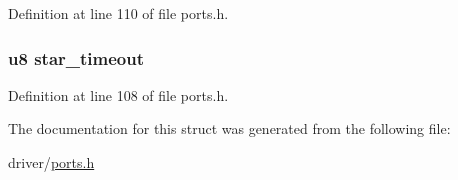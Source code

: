 \-Definition at line 110 of file ports.\-h.

\hypertarget{structstruct__button_a1b529be95d311858f31847dc3b73b7d1}{
\subsubsection[{star\-\_\-timeout}]{\setlength{\rightskip}{0pt plus 5cm}u8 {\bf star\-\_\-timeout}}}\label{structstruct__button_a1b529be95d311858f31847dc3b73b7d1}


\-Definition at line 108 of file ports.\-h.



\-The documentation for this struct was generated from the following file\-:\begin{DoxyCompactItemize}
\item 
driver/\hyperlink{ports_8h}{ports.\-h}\end{DoxyCompactItemize}

